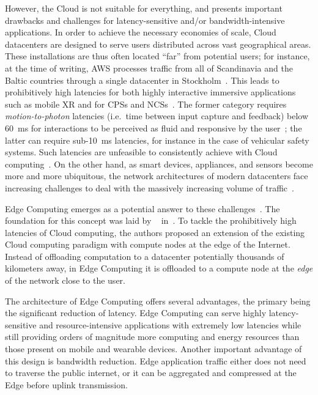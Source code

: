 However, the Cloud is not suitable for everything, and presents important drawbacks and challenges for latency-sensitive and/or bandwidth-intensive applications.
In order to achieve the necessary economies of scale, Cloud datacenters are designed to serve users distributed across vast geographical areas.
These installations are thus often located ``far'' from potential users;
for instance, at the time of writing, \gls{AWS} processes traffic from all of Scandinavia and the Baltic countries through a single datacenter in Stockholm~\cite{awsregions}.
This leads to prohibitively high latencies for both highly interactive immersive applications such as mobile \gls{XR} and for \glspl{CPS} and \glspl{NCS}~\cite{tolia2006quantifying,lagar2007interactive,satyanarayanan2009case,varghese2016challenges,shi2016promise}.
The former category requires \emph{motion-to-photon} latencies (i.e.\ time between input capture and feedback) below \SI{60}{\milli\second} for interactions to be perceived as fluid and responsive by the user~\cite{chen2017empirical}; the latter can require sub-\SI{10}{\milli\second} latencies, for instance in the case of vehicular safety systems.
Such latencies are unfeasible to consistently achieve with Cloud computing~\cite{dang2021cloudy}.
On the other hand, as smart devices, appliances, and sensors become more and more ubiquitous, the network architectures of modern datacenters face increasing challenges to deal with the massively increasing volume of traffic~\cite{shi2016edge,wang2019towards}.

\medskip
Edge Computing emerges as a potential answer to these challenges~\cite{satyanarayanan2009case,shi2016promise,shi2016edge,varghese2016challenges,satyanarayanan2017emergence,bittmann2017edge,wang2019towards}.
The foundation for this concept was laid by \citeauthor{satyanarayanan2009case}~\cite{satyanarayanan2009case} in\ \citeyear{satyanarayanan2009case}.
To tackle the prohibitively high latencies of Cloud computing, the authors proposed an extension of the existing Cloud computing paradigm with compute nodes at the edge of the Internet.
Instead of offloading computation to a datacenter potentially thousands of kilometers away, in Edge Computing it is offloaded to a compute node at the \emph{edge} of the network close to the user.

The architecture of Edge Computing offers several advantages, the primary being the significant reduction of latency.
Edge Computing can serve highly latency-sensitive and resource-intensive applications with extremely low latencies while still providing orders of magnitude more computing and energy resources than those present on mobile and wearable devices.
Another important advantage of this design is bandwidth reduction.
Edge application traffic either does not need to traverse the public internet, or it can be aggregated and compressed at the Edge before uplink transmission.

